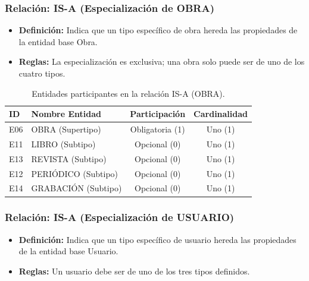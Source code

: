 \subsubsection{Relación: IS-A (Especialización de OBRA)}
\begin{itemize}
	\item\textbf{Definición:} Indica que un tipo específico de obra hereda las propiedades de la entidad base Obra.
	\item\textbf{Reglas:} La especialización es exclusiva; una obra solo puede ser de uno de los cuatro tipos.
\end{itemize}

\begin{table}[H]
	\centering
	\caption{Entidades participantes en la relación IS-A (OBRA).}
	\label{tab:rel_isa_obra}
	\small
	\begin{tabularx}{\textwidth}{X l c c}
		\toprule
		\textbf{ID} & \textbf{Nombre Entidad} & \textbf{Participación} & \textbf{Cardinalidad} \\
		\midrule
		E06 & OBRA (Supertipo) & Obligatoria (1) & Uno (1) \\
		\addlinespace
		E11 & LIBRO (Subtipo) & Opcional (0) & Uno (1) \\
		\addlinespace
		E13 & REVISTA (Subtipo) & Opcional (0) & Uno (1) \\
		\addlinespace
		E12 & PERIÓDICO (Subtipo) & Opcional (0) & Uno (1) \\
		\addlinespace
		E14 & GRABACIÓN (Subtipo) & Opcional (0) & Uno (1) \\
		\bottomrule
	\end{tabularx}
\end{table}

\subsubsection{Relación: IS-A (Especialización de USUARIO)}
\begin{itemize}
	\item\textbf{Definición:} Indica que un tipo específico de usuario hereda las propiedades de la entidad base Usuario.
	\item\textbf{Reglas:} Un usuario debe ser de uno de los tres tipos definidos.
\end{itemize}

